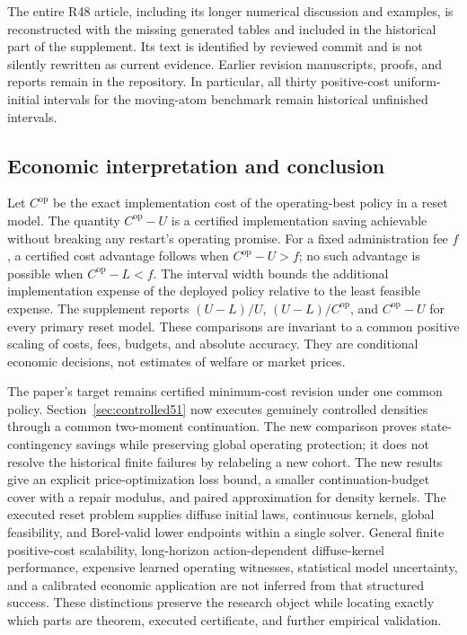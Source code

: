 The entire R48 article, including its longer numerical discussion and examples, is reconstructed with the missing generated tables and included in the historical part of the supplement. Its text is identified by reviewed commit and is not silently rewritten as current evidence. Earlier revision manuscripts, proofs, and reports remain in the repository. In particular, all thirty positive-cost uniform-initial intervals for the moving-atom benchmark remain historical unfinished intervals.

\subsection{Economic interpretation and conclusion}
Let $C^{\mathrm{op}}$ be the exact implementation cost of the operating-best policy in a reset model. The quantity $C^{\mathrm{op}}-U$ is a certified implementation saving achievable without breaking any restart's operating promise. For a fixed administration fee $f$, a certified cost advantage follows when $C^{\mathrm{op}}-U>f$; no such advantage is possible when $C^{\mathrm{op}}-L<f$. The interval width bounds the additional implementation expense of the deployed policy relative to the least feasible expense. The supplement reports $(U-L)/U$, $(U-L)/C^{\mathrm{op}}$, and $C^{\mathrm{op}}-U$ for every primary reset model. These comparisons are invariant to a common positive scaling of costs, fees, budgets, and absolute accuracy. They are conditional economic decisions, not estimates of welfare or market prices.

The paper's target remains certified minimum-cost revision under one common policy. Section~\ref{sec:controlled51} now executes genuinely controlled densities through a common two-moment continuation. The new comparison proves state-contingency savings while preserving global operating protection; it does not resolve the historical finite failures by relabeling a new cohort. The new results give an explicit price-optimization loss bound, a smaller continuation-budget cover with a repair modulus, and paired approximation for density kernels. The executed reset problem supplies diffuse initial laws, continuous kernels, global feasibility, and Borel-valid lower endpoints within a single solver. General finite positive-cost scalability, long-horizon action-dependent diffuse-kernel performance, expensive learned operating witnesses, statistical model uncertainty, and a calibrated economic application are not inferred from that structured success. These distinctions preserve the research object while locating exactly which parts are theorem, executed certificate, and further empirical validation.
